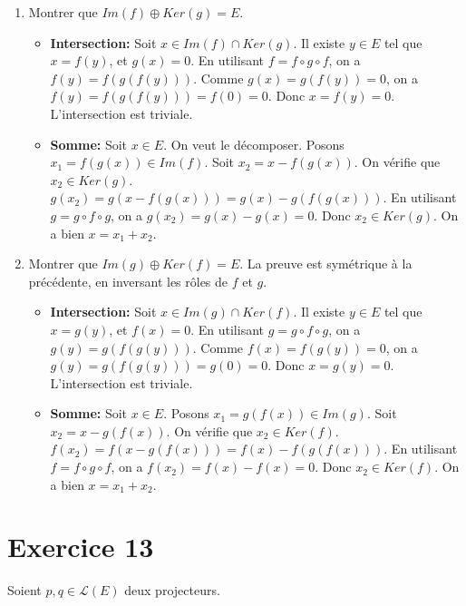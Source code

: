 \documentclass[french]{yLectureNote}
\begin{document}
\begin{enumerate}
    \item Montrer que $Im(f) \oplus Ker(g) = E$.
    \begin{itemize}
        \item \textbf{Intersection:} Soit $x \in Im(f) \cap Ker(g)$. Il existe $y \in E$ tel que $x=f(y)$, et $g(x)=0$. En utilisant $f=f\circ g\circ f$, on a $f(y)=f(g(f(y)))$. Comme $g(x)=g(f(y))=0$, on a $f(y)=f(g(f(y)))=f(0)=0$. Donc $x=f(y)=0$. L'intersection est triviale.
        \item \textbf{Somme:} Soit $x \in E$. On veut le décomposer. Posons $x_1=f(g(x)) \in Im(f)$. Soit $x_2=x-f(g(x))$. On vérifie que $x_2 \in Ker(g)$.
        $g(x_2)=g(x-f(g(x)))=g(x)-g(f(g(x)))$. En utilisant $g=g\circ f\circ g$, on a $g(x_2)=g(x)-g(x)=0$.
        Donc $x_2 \in Ker(g)$. On a bien $x = x_1+x_2$.
    \end{itemize}

    \item Montrer que $Im(g) \oplus Ker(f) = E$.
    La preuve est symétrique à la précédente, en inversant les rôles de $f$ et $g$.
    \begin{itemize}
        \item \textbf{Intersection:} Soit $x \in Im(g) \cap Ker(f)$. Il existe $y \in E$ tel que $x=g(y)$, et $f(x)=0$. En utilisant $g=g\circ f\circ g$, on a $g(y)=g(f(g(y)))$. Comme $f(x)=f(g(y))=0$, on a $g(y)=g(f(g(y)))=g(0)=0$. Donc $x=g(y)=0$. L'intersection est triviale.
        \item \textbf{Somme:} Soit $x \in E$. Posons $x_1=g(f(x)) \in Im(g)$. Soit $x_2=x-g(f(x))$. On vérifie que $x_2 \in Ker(f)$.
        $f(x_2)=f(x-g(f(x)))=f(x)-f(g(f(x)))$. En utilisant $f=f\circ g\circ f$, on a $f(x_2)=f(x)-f(x)=0$.
        Donc $x_2 \in Ker(f)$. On a bien $x = x_1+x_2$.
    \end{itemize}
\end{enumerate}

\section{Exercice 13}

Soient $p,q \in \mathcal{L}(E)$ deux projecteurs.
\end{document}
